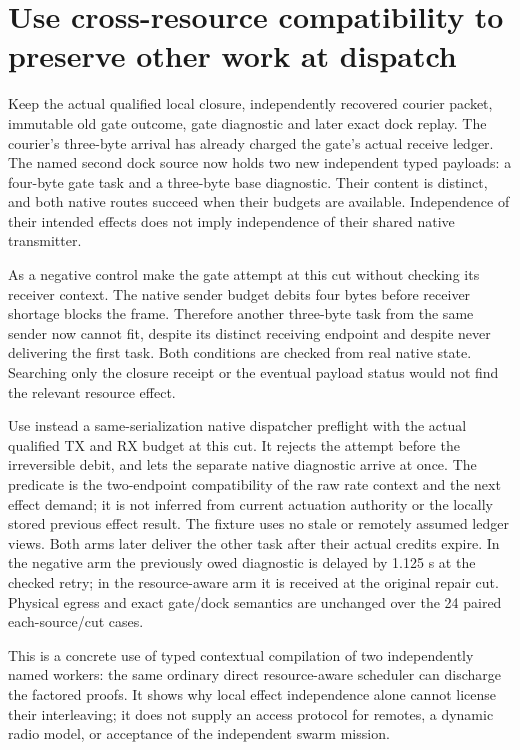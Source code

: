 \documentclass{article}
\begin{document}
\section*{Use cross-resource compatibility to preserve other work at dispatch}
Keep the actual qualified local closure, independently recovered
courier packet, immutable old gate outcome, gate diagnostic and later
exact dock replay. The courier's three-byte arrival has already
charged the gate's actual receive ledger. The named second dock
source now holds two new independent typed payloads: a four-byte
gate task and a three-byte base diagnostic. Their content is distinct,
and both native routes succeed when their budgets are available.
Independence of their intended effects does not imply independence
of their shared native transmitter.

As a negative control make the gate attempt at this cut without
checking its receiver context. The native sender budget debits four
bytes before receiver shortage blocks the frame. Therefore another
three-byte task from the same sender now cannot fit, despite its
distinct receiving endpoint and despite never delivering the first
task. Both conditions are checked from real native state.
Searching only the closure receipt or the eventual payload status
would not find the relevant resource effect.

Use instead a same-serialization native dispatcher preflight with
the actual qualified TX and RX budget at this cut. It rejects the
attempt before the irreversible debit, and lets the separate native
diagnostic arrive at once. The predicate is the two-endpoint
compatibility of the raw rate context and the next effect demand;
it is not inferred from current actuation authority or the locally
stored previous effect result. The fixture uses no stale or remotely
assumed ledger views. Both arms later deliver the other task after
their actual credits expire. In the negative arm the previously
owed diagnostic is delayed by 1.125 s at the checked retry; in the
resource-aware arm it is received at the original repair cut.
Physical egress and exact gate/dock semantics are unchanged over
the 24 paired each-source/cut cases.

This is a concrete use of typed contextual compilation of two
independently named workers: the same ordinary direct resource-aware
scheduler can discharge the factored proofs. It shows why local
effect independence alone cannot license their interleaving;
it does not supply an access protocol for remotes, a dynamic
radio model, or acceptance of the independent swarm mission.
\end{document}
